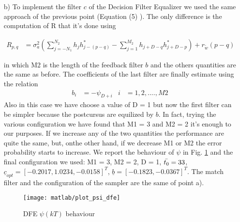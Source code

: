 \documentclass[a4paper,oneside]{article}
\renewcommand{\vec}[1]{\underline{#1}}
\begin{document}
\begin{itemize}
\item[b)] To implement the filter $c$ of the Decision Filter Equalizer we used the same approach of the previous point (Equation (5) ). The only difference is the computation of R that it's done using

\begin{align}
 R_{p,q} &= \sigma^2_a\left( \sum_{j=-N_1}^{N_2}h_jh^*_{j-(p-q)} - \sum_{j=1}^{M_2}h_{j+D-q}h^*_{j+D-p} \right) + r_{\tilde{w}}(p-q)
\end{align}

in which M2 is the length of the feedback filter $b$ and the others quantities are the same as before.
The coefficients of the last filter are finally estimate using the relation 
\begin{align}
b_i &= - \psi_{D+i}&  i &= 1,2,....,M2
\end{align}
Also in this case we have choose a value of D = 1 but now the first filter can be simpler because the postcursus are equilized by $b$. In fact, trying the various configuration we have found that M1 = 3 and M2 = 2 it's enough to our purposes. If we increase any of the two quantities the performance are quite the same, but, onthe other hand, if we decrease M1 or M2 the error probability starts to increase. We report the behaviour of $\psi$ in Fig. \ref{plot:psi_dfe_1} and the final configuration we used:
M1 = 3, M2 = 2, D = 1, $\Bar{t_0} = 33$, $\vec{c}_{opt} = [-0.2017, 1.0234, -0.0158]^T$, $\vec{b} = [-0.1823, -0.0367]^T$. The match filter and the configuration of the sampler are the same of point a).

\begin{figure}[h]
  \centering
  \texttt{[image: matlab/plot\_psi\_dfe]}
  \caption{DFE $\psi(kT)$ behaviour}
  \label{plot:psi_dfe_1}
\end{figure}


\end{itemize}
\end{document}
